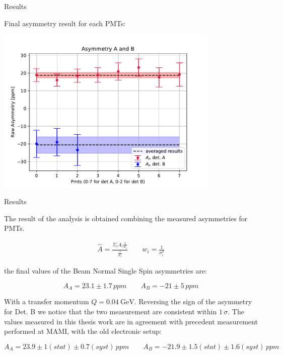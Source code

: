 \documentclass[9pt,a4paper]{beamer}
\begin{document}
\begin{frame}{Results}
\begin{center}
Final asymmetry result for each PMTs:
\end{center}
\begin{center}
\includegraphics[width = 0.80\textwidth]{figures/FirstResult.pdf}
\end{center}

\end{frame}

\begin{frame}{Results}

The result of the analysis is obtained combining the measured asymmetries for PMTs. 

\begin{gather*}
\hat{A} =  \frac{\Sigma_{i} A_{i} \frac{1}{w_{i}}}{\frac{1}{w_{i}}} \qquad w_{i} = \frac{1}{\sigma^{2}_{i}}
\end{gather*}

the final values of the Beam Normal Single Spin asymmetries are:

\begin{equation}
A_{A} = 23.1 \pm 1.7 \, ppm  \qquad A_{B} = -21 \pm 5 \, ppm
\end{equation}

With a transfer momentum $Q = \SI{0.04}{\giga \electronvolt}$. Reversing the sign of the asymmetry for Det. B we notice that the two measurement are consistent within $1 \, \sigma$. The values measured in this thesis work are in agreement with precedent measurement performed at MAMI, with the old electronic setup:

\begin{equation}
A_{A} = 23.9 \pm 1(stat) \pm 0.7 (syst) \, ppm  \qquad A_{B} = -21.9 \pm 1.5(stat) \pm 1.6(syst) \, ppm
\end{equation}


\end{frame}
\end{document}
